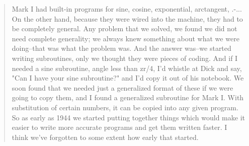 \begin{quotation}
    Mark I had built-in programs for sine, cosine, exponential, arctangent, .-... On the
other hand, because they were wired into the machine, they had to be completely general.
Any problem that we solved, we found we did not need complete generality; we always
knew something about what we were doing--that was what the problem was. And the answer was--we started writing subroutines, only we thought they were pieces of coding.
And if I needed a sine subroutine, angle less than zr/4, I'd whistle at Dick and say, "Can I
have your sine subroutine?" and I'd copy it out of his notebook. We soon found that we
needed just a generalized format of these if we were going to copy them, and I found a
generalized subroutine for Mark I. With substitution of certain numbers, it can be copied
into any given program. So as early as 1944 we started putting together things which would
make it easier to write more accurate programs and get them written faster. I think we've
forgotten to some extent how early that started.
\end{quotation}
